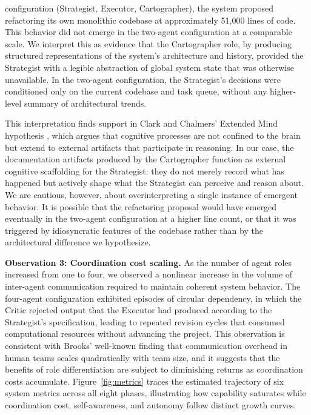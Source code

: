 configuration (Strategist, Executor, Cartographer), the system proposed refactoring its own monolithic codebase at approximately 51,000 lines of code. This behavior did not emerge in the two-agent configuration at a comparable scale. We interpret this as evidence that the Cartographer role, by producing structured representations of the system's architecture and history, provided the Strategist with a legible abstraction of global system state that was otherwise unavailable. In the two-agent configuration, the Strategist's decisions were conditioned only on the current codebase and task queue, without any higher-level summary of architectural trends.

This interpretation finds support in Clark and Chalmers' Extended Mind hypothesis \cite{clark1998}, which argues that cognitive processes are not confined to the brain but extend to external artifacts that participate in reasoning. In our case, the documentation artifacts produced by the Cartographer function as external cognitive scaffolding for the Strategist: they do not merely record what has happened but actively shape what the Strategist can perceive and reason about. We are cautious, however, about overinterpreting a single instance of emergent behavior. It is possible that the refactoring proposal would have emerged eventually in the two-agent configuration at a higher line count, or that it was triggered by idiosyncratic features of the codebase rather than by the architectural difference we hypothesize.

\textbf{Observation 3: Coordination cost scaling.} As the number of agent roles increased from one to four, we observed a nonlinear increase in the volume of inter-agent communication required to maintain coherent system behavior. The four-agent configuration exhibited episodes of circular dependency, in which the Critic rejected output that the Executor had produced according to the Strategist's specification, leading to repeated revision cycles that consumed computational resources without advancing the project. This observation is consistent with Brooks' \cite{brooks1975} well-known finding that communication overhead in human teams scales quadratically with team size, and it suggests that the benefits of role differentiation are subject to diminishing returns as coordination costs accumulate. Figure~\ref{fig:metrics} traces the estimated trajectory of six system metrics across all eight phases, illustrating how capability saturates while coordination cost, self-awareness, and autonomy follow distinct growth curves.

